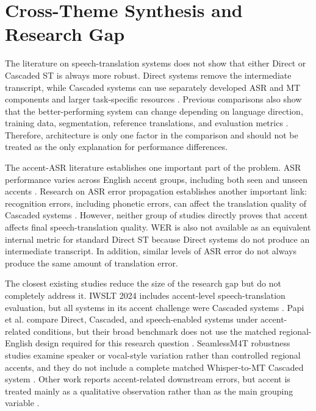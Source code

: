 \section{Cross-Theme Synthesis and Research Gap}
\label{sec:synthesis}

The literature on speech-translation systems does not show that either Direct
or Cascaded ST is always more robust. Direct systems remove the intermediate
transcript, while Cascaded systems can use separately developed ASR and MT
components and larger task-specific resources \cite{sperber2020endtoend}.
Previous comparisons also show that the better-performing system can change
depending on language direction, training data, segmentation, reference
translations, and evaluation metrics
\cite{bentivogli2021cascade,anastasopoulos2021iwslt,
etchegoyhen2022casestudy}. Therefore, architecture is only one factor in the
comparison and should not be treated as the only explanation for performance
differences.

The accent-ASR literature establishes one important part of the problem. ASR
performance varies across English accent groups, including both seen and
unseen accents \cite{shi2021aesrc,prabhu2023accentcodebooks,swain2026fair}.
Research on ASR error propagation establishes another important link:
recognition errors, including phonetic errors, can affect the translation
quality of Cascaded systems
\cite{le2017disentangling,sperber2019,pida2026}. However, neither group of
studies directly proves that accent affects final speech-translation quality.
WER is also not available as an equivalent internal metric for standard Direct
ST because Direct systems do not produce an intermediate transcript. In
addition, similar levels of ASR error do not always produce the same amount of
translation error.

The closest existing studies reduce the size of the research gap but do not
completely address it. IWSLT 2024 includes accent-level speech-translation
evaluation, but all systems in its accent challenge were Cascaded systems
\cite{ahmad2024iwslt}. Papi et al. compare Direct, Cascaded, and speech-enabled
systems under accent-related conditions, but their broad benchmark does not use
the matched regional-English design required for this research question
\cite{papi2026hearing}. SeamlessM4T robustness studies examine speaker or
vocal-style variation rather than controlled regional accents, and they do not
include a complete matched Whisper-to-MT Cascaded system
\cite{seamlessm4t2023,seamless2023}. Other work reports accent-related
downstream errors, but accent is treated mainly as a qualitative observation
rather than as the main grouping variable \cite{losttranscription2026}.

